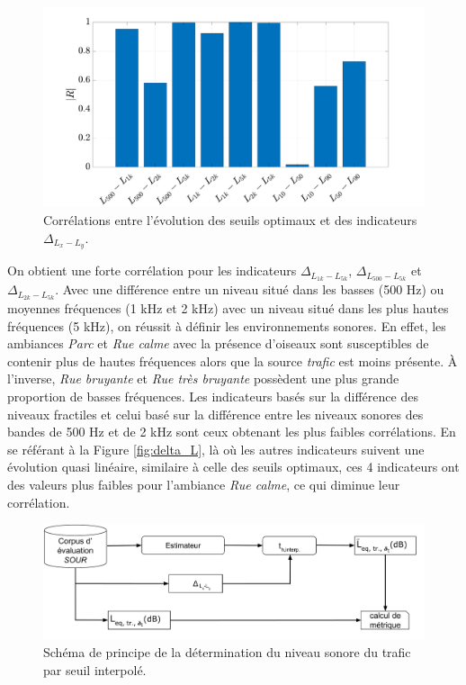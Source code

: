 \begin{figure}[h]
\centering
\includegraphics[width=0.9\linewidth]{./figures/resultats/Opt_correlation.pdf}
\caption{Corrélations entre l'évolution des seuils optimaux et des indicateurs $\Delta_{L_x-L_y}$.}
\label{fig:correlation}
\end{figure}

On obtient une forte corrélation pour les indicateurs $\Delta_{L_{1k}-L_{5k}}$, $\Delta_{L_{500}-L_{5k}}$ et $\Delta_{L_{2k}-L_{5k}}$. Avec une différence entre un niveau situé dans les basses (500 Hz) ou moyennes fréquences (1 kHz et 2 kHz) avec un niveau situé dans les plus hautes fréquences (5 kHz), on réussit à définir les environnements sonores. En effet, les ambiances \textit{Parc} et \textit{Rue calme} avec la présence d'oiseaux sont susceptibles de contenir plus de hautes fréquences alors que la source \textit{trafic} est moins présente. À l'inverse, \textit{Rue bruyante} et \textit{Rue très bruyante} possèdent une plus grande proportion de basses fréquences. 
Les indicateurs basés sur la différence des niveaux fractiles et celui basé sur la différence entre les niveaux sonores des bandes de 500 Hz et de 2 kHz sont ceux obtenant les plus faibles corrélations. En se référant à la Figure \ref{fig:delta_L}, là où les autres indicateurs suivent une évolution quasi linéaire, similaire à celle des seuils optimaux, ces 4 indicateurs ont des valeurs plus faibles pour l'ambiance \textit{Rue calme}, ce qui diminue leur corrélation.

\begin{figure}[h]
\centering
\includegraphics[width=.9\linewidth]{./figures/NMF/bloc_diagram_interpolation.pdf}
\caption{Schéma de principe de la détermination du niveau sonore du trafic par seuil interpolé.}
\label{fig:schema_NMFIS_interp}
\end{figure}

